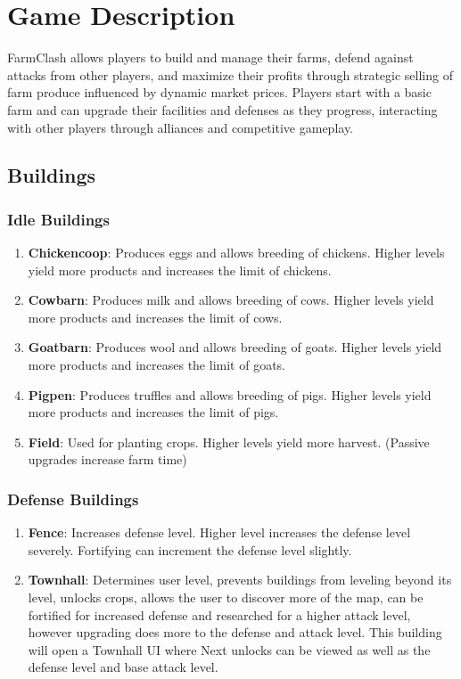 \documentclass[12pt]{article}
\begin{document}
\section{Game Description}
FarmClash allows players to build and manage their farms, defend against attacks from other players, and maximize their profits through strategic selling of farm produce influenced by dynamic market prices. Players start with a basic farm and can upgrade their facilities and defenses as they progress, interacting with other players through alliances and competitive gameplay.
\subsection{Buildings}

\subsubsection{Idle Buildings}

\begin{enumerate}
    \item \textbf{Chickencoop}: Produces eggs and allows breeding of chickens. Higher levels yield more products and increases the limit of chickens.
    \item \textbf{Cowbarn}: Produces milk and allows breeding of cows. Higher levels yield more products and increases the limit of cows.
    \item \textbf{Goatbarn}: Produces wool and allows breeding of goats. Higher levels yield more products and increases the limit of goats.
    \item \textbf{Pigpen}: Produces truffles and allows breeding of pigs. Higher levels yield more products and increases the limit of pigs.
    \item \textbf{Field}: Used for planting crops. Higher levels yield more harvest. (Passive upgrades increase farm time)
\end{enumerate}

\subsubsection{Defense Buildings}

\begin{enumerate}
    \item \textbf{Fence}:
    Increases defense level. Higher level increases the defense level severely. Fortifying can increment the defense level slightly.
    \item \textbf{Townhall}: Determines user level, prevents buildings from leveling beyond its level, unlocks crops, allows the user to discover more of the map, can be fortified for increased defense and researched for a higher attack level, however upgrading does more to the defense and attack level. This building will open a Townhall UI where Next unlocks can be viewed as well as the defense level and base attack level.
\end{enumerate}
\end{document}
